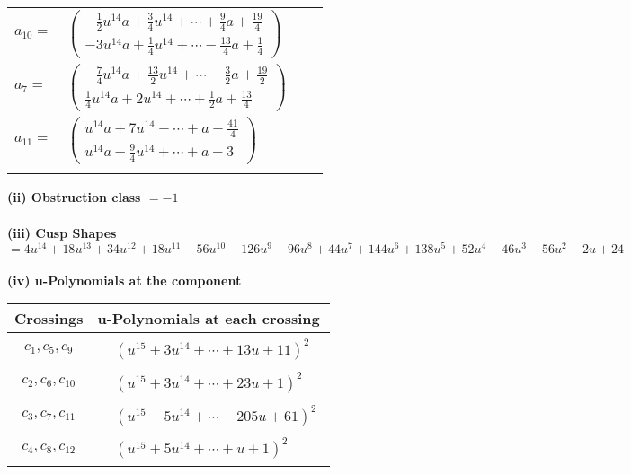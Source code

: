 \documentclass[1p]{elsarticle_modified}
\theoremstyle{definition}
\begin{document}
\begin{tabular}{m{7pt} m{180pt} m{7pt} m{180pt} }
\flushright $a_{10}=$&$\begin{pmatrix}-\frac{1}{2} u^{14} a+\frac{3}{4} u^{14}+\cdots+\frac{9}{4} a+\frac{19}{4}\\-3 u^{14} a+\frac{1}{4} u^{14}+\cdots-\frac{13}{4} a+\frac{1}{4}\end{pmatrix}$ \\
\flushright $a_{7}=$&$\begin{pmatrix}-\frac{7}{4} u^{14} a+\frac{13}{2} u^{14}+\cdots-\frac{3}{2} a+\frac{19}{2}\\\frac{1}{4} u^{14} a+2 u^{14}+\cdots+\frac{1}{2} a+\frac{13}{4}\end{pmatrix}$ \\
\flushright $a_{11}=$&$\begin{pmatrix}u^{14} a+7 u^{14}+\cdots+a+\frac{41}{4}\\u^{14} a-\frac{9}{4} u^{14}+\cdots+a-3\end{pmatrix}$\\&\end{tabular}
\flushleft \textbf{(ii) Obstruction class $= -1$}\\~\\
\flushleft \textbf{(iii) Cusp Shapes $= 4 u^{14}+18 u^{13}+34 u^{12}+18 u^{11}-56 u^{10}-126 u^9-96 u^8+44 u^7+144 u^6+138 u^5+52 u^4-46 u^3-56 u^2-2 u+24$}\\~\\
\newpage\renewcommand{\arraystretch}{1}
\flushleft \textbf{(iv) u-Polynomials at the component}\newline \\
\begin{tabular}{m{50pt}|m{274pt}}
Crossings & \hspace{64pt}u-Polynomials at each crossing \\
\hline $$\begin{aligned}c_{1},c_{5},c_{9}\end{aligned}$$&$\begin{aligned}
&(u^{15}+3 u^{14}+\cdots+13 u+11)^{2}
\end{aligned}$\\
\hline $$\begin{aligned}c_{2},c_{6},c_{10}\end{aligned}$$&$\begin{aligned}
&(u^{15}+3 u^{14}+\cdots+23 u+1)^{2}
\end{aligned}$\\
\hline $$\begin{aligned}c_{3},c_{7},c_{11}\end{aligned}$$&$\begin{aligned}
&(u^{15}-5 u^{14}+\cdots-205 u+61)^{2}
\end{aligned}$\\
\hline $$\begin{aligned}c_{4},c_{8},c_{12}\end{aligned}$$&$\begin{aligned}
&(u^{15}+5 u^{14}+\cdots+u+1)^{2}
\end{aligned}$\\
\hline
\end{tabular}\\~\\
\end{document}
